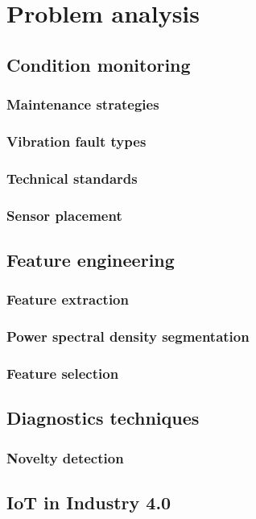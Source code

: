 \chapter{Problem analysis}


\section{Condition monitoring}

\subsection{Maintenance strategies}

\subsection{Vibration fault types}

\subsection{Technical standards}

\subsection{Sensor placement}  




\section{Feature engineering}


\subsection{Feature extraction}

\subsection{Power spectral density segmentation}

\subsection{Feature selection}


\section{Diagnostics techniques}

\subsection{Novelty detection}



\section{IoT in Industry 4.0}